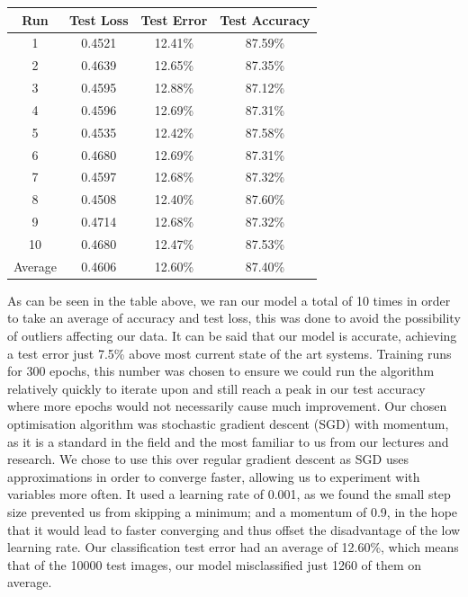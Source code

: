 \documentclass[journal]{IEEEtran}
\begin{document}

\begin{center}
  \begin{tabular}{c|c|c|c} 
    Run & Test Loss & Test Error & Test Accuracy \\ [0.5ex] 
    \hline
    1 & 0.4521 & 12.41\% & 87.59\% \\ 
    2 & 0.4639 & 12.65\% & 87.35\% \\
    3 & 0.4595 & 12.88\% & 87.12\% \\
    4 & 0.4596 & 12.69\% & 87.31\% \\
    5 & 0.4535 & 12.42\% & 87.58\% \\
    6 & 0.4680 & 12.69\% & 87.31\% \\
    7 & 0.4597 & 12.68\% & 87.32\% \\
    8 & 0.4508 & 12.40\% & 87.60\% \\
    9 & 0.4714 & 12.68\% & 87.32\% \\
    10 & 0.4680 & 12.47\% & 87.53\% \\ 
    Average & 0.4606 & 12.60\% & 87.40\% \\ [0.5ex]
  \end{tabular}
\end{center}

As can be seen in the table above, we ran our model a total of  10  times  in  order  to  take  an  average  of  accuracy  and  test loss, this was done to avoid the possibility of outliers affecting our data. It can be said that our model is accurate, achieving a test error just 7.5\% above most current state of the art systems. Training runs for 300 epochs, this number was chosen to ensure we could run the algorithm relatively quickly to iterate upon and still reach a peak in our test accuracy where more epochs would not necessarily cause much improvement. Our chosen optimisation algorithm was stochastic gradient descent (SGD) with momentum, as it is a standard in the field and the most familiar to us from our lectures and research. We chose to use this over regular gradient descent as SGD uses approximations in order to converge faster, allowing us to experiment with variables more often. It used a learning rate of 0.001, as we found the small step size prevented us from skipping a minimum; and a momentum of 0.9, in the hope that  it  would  lead  to  faster  converging and thus offset the disadvantage of the low learning rate. Our classification test error had an average of 12.60\%, which means that of the 10000 test images, our model misclassified just 1260 of them on average.
\end{document}

